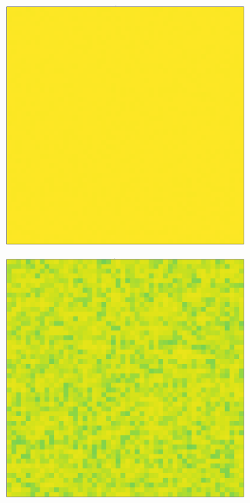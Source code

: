 \documentclass[../main.tex]{subfiles}
\begin{document}
\begin{figure}[H]
    \begin{subfigure}[b]{0.11\textwidth}
        \centering 
        \includegraphics[keepaspectratio, width = \linewidth]{../figures/fig3.8.2.1.png}
    \end{subfigure}
    \hfill
    \begin{subfigure}[b]{0.11\textwidth}
        \centering 
        \includegraphics[keepaspectratio, width = \linewidth]{../figures/fig3.8.2.2.png}

\end{subfigure}
\end{figure}
\end{document}
